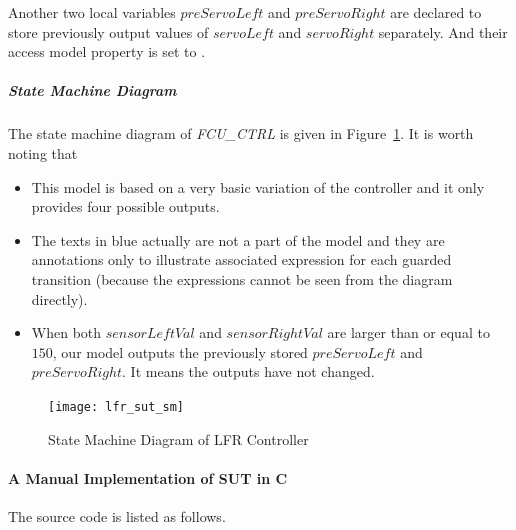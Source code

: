 Another two local variables $preServoLeft$ and $preServoRight$ are declared to store previously output values of $servoLeft$ and $servoRight$ separately. And their access model property is set to .

\subparagraph{State Machine Diagram}
The state machine diagram of \emph{FCU\_CTRL} is given in Figure~\ref{fig:lfr-sm-diagram}. It is worth noting that
\begin{itemize}
    \item This model is based on a very basic variation of the controller and it only provides four possible outputs.
    \item The texts in blue actually are not a part of the model and they are annotations only to illustrate associated expression for each guarded transition (because the expressions cannot be seen from the diagram directly).
    \item When both $sensorLeftVal$ and $sensorRightVal$ are larger than or equal to $150$, our model outputs the previously stored $preServoLeft$ and $preServoRight$. It means the outputs have not changed. 
\end{itemize}
\begin{figure}[htb!]
    \centering
  \texttt{[image: lfr\_sut\_sm]}
    \caption{State Machine Diagram of LFR Controller}
    \label{fig:lfr-sm-diagram}
\end{figure}


\paragraph{A Manual Implementation of SUT in C}

The source code is listed as follows.


